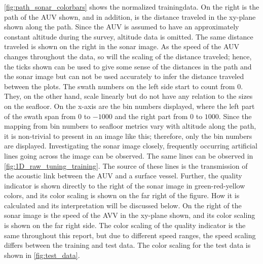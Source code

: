 \cref{fig:path_sonar_colorbars} shows the normalized trainingdata. On the right is the path of the AUV shown, and in addition, is the distance traveled in the xy-plane shown along the path. Since the AUV is assumed to have an approximately constant altitude during the survey, altitude data is omitted. The same distance traveled is shown on the right in the sonar image. As the speed of the AUV changes throughout the data, so will the scaling of the distance traveled; hence, the ticks shown can be used to give some sense of the distances in the path and the sonar image but can not be used accurately to infer the distance traveled between the plots. The swath numbers on the left side start to count from $0$. They, on the other hand, scale linearly but do not have any relation to the sizes on the seafloor. On the x-axis are the bin numbers displayed, where the left part of the swath span from $0$ to $-1000$ and the right part from $0$ to $1000$. Since the mapping from bin numbers to seafloor metrics vary with altitude along the path, it is non-trivial to present in an image like this; therefore, only the bin numbers are displayed. Investigating the sonar image closely, frequently occurring artificial lines going across the image can be observed. The same lines can be observed in \cref{fig:1D_raw_tuning_training}. The source of these lines is the transmission of the acoustic link between the AUV and a surface vessel. Further, the quality indicator is shown directly to the right of the sonar image in green-red-yellow colors, and its color scaling is shown on the far right of the figure. How it is calculated and its interpretation will be discussed below. On the right of the sonar image is the speed of the AVV in the xy-plane shown, and its color scaling is shown on the far right side. The color scaling of the quality indicator is the same throughout this report, but due to different speed ranges, the speed scaling differs between the training and test data. The color scaling for the test data is shown in \cref{fig:test_data}. 

